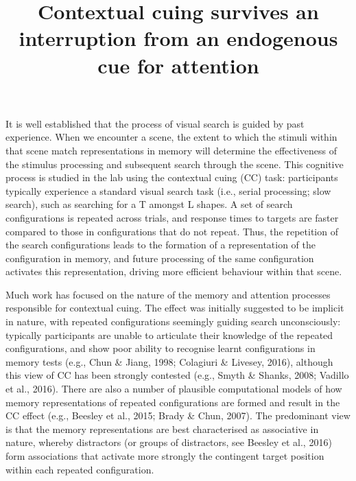 \documentclass[
  man,
  floatsintext,
  longtable,
  nolmodern,
  notxfonts,
  notimes,
  colorlinks=true,linkcolor=blue,citecolor=blue,urlcolor=blue]{apa7}
\title{Contextual cuing survives an interruption from an endogenous cue
for attention}
\begin{document}
\maketitle


\setcounter{secnumdepth}{-\maxdimen} %

\setlength\LTleft{0pt}




It is well established that the process of visual search is guided by
past experience. When we encounter a scene, the extent to which the
stimuli within that scene match representations in memory will determine
the effectiveness of the stimulus processing and subsequent search
through the scene. This cognitive process is studied in the lab using
the contextual cuing (CC) task: participants typically experience a
standard visual search task (i.e., serial processing; slow search), such
as searching for a T amongst L shapes. A set of search configurations is
repeated across trials, and response times to targets are faster
compared to those in configurations that do not repeat. Thus, the
repetition of the search configurations leads to the formation of a
representation of the configuration in memory, and future processing of
the same configuration activates this representation, driving more
efficient behaviour within that scene.

Much work has focused on the nature of the memory and attention
processes responsible for contextual cuing. The effect was initially
suggested to be implicit in nature, with repeated configurations
seemingly guiding search unconsciously: typically participants are
unable to articulate their knowledge of the repeated configurations, and
show poor ability to recognise learnt configurations in memory tests
(e.g., Chun \& Jiang, 1998; Colagiuri \& Livesey, 2016), although this
view of CC has been strongly contested (e.g., Smyth \& Shanks, 2008;
Vadillo et al., 2016). There are also a number of plausible
computational models of how memory representations of repeated
configurations are formed and result in the CC effect (e.g., Beesley et
al., 2015; Brady \& Chun, 2007). The predominant view is that the memory
representations are best characterised as associative in nature, whereby
distractors (or groups of distractors, see Beesley et al., 2016) form
associations that activate more strongly the contingent target position
within each repeated configuration.
\end{document}

